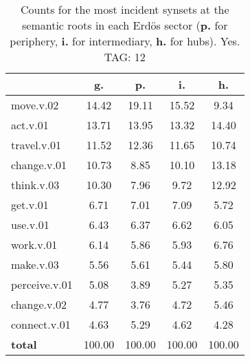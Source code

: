 \begin{table}[h!]
\begin{center}
\begin{tabular}{| l | c | c | c | c |}\hline
 & g. & p. & i. & h. \\\hline
move.v.02 & 14.42  & 19.11  & 15.52  & 9.34 \\\hline
act.v.01 & 13.71  & 13.95  & 13.32  & 14.40 \\\hline
travel.v.01 & 11.52  & 12.36  & 11.65  & 10.74 \\\hline
change.v.01 & 10.73  & 8.85  & 10.10  & 13.18 \\\hline
think.v.03 & 10.30  & 7.96  & 9.72  & 12.92 \\\hline
get.v.01 & 6.71  & 7.01  & 7.09  & 5.72 \\\hline
use.v.01 & 6.43  & 6.37  & 6.62  & 6.05 \\\hline
work.v.01 & 6.14  & 5.86  & 5.93  & 6.76 \\\hline
make.v.03 & 5.56  & 5.61  & 5.44  & 5.80 \\\hline
perceive.v.01 & 5.08  & 3.89  & 5.27  & 5.35 \\\hline
change.v.02 & 4.77  & 3.76  & 4.72  & 5.46 \\\hline
connect.v.01 & 4.63  & 5.29  & 4.62  & 4.28 \\\hline
{{\bf total}} & 100.00  & 100.00  & 100.00  & 100.00 \\\hline
\end{tabular}
\caption{Counts for the most incident synsets at the semantic roots in each Erd\"os sector ({\bf p.} for periphery, {\bf i.} for intermediary, {\bf h.} for hubs). Yes. TAG: 12}
\end{center}
\end{table}